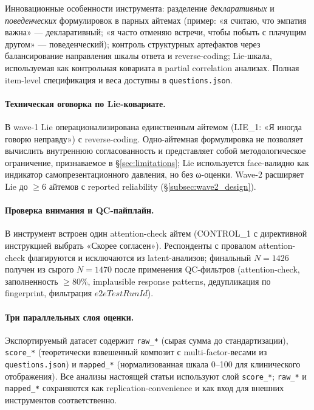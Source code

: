Инновационные особенности инструмента: разделение \emph{декларативных} и \emph{поведенческих} формулировок в парных айтемах (пример: «я считаю, что эмпатия важна» --- декларативный; «я часто отменяю встречи, чтобы побыть с плачущим другом» --- поведенческий); контроль структурных артефактов через балансирование направления шкалы ответа и reverse-coding; Lie-шкала, используемая как контрольная ковариата в partial correlation анализах. Полная item-level спецификация и веса доступны в \texttt{questions.json}.

\paragraph{Техническая оговорка по Lie-ковариате.} В wave-1 Lie операционализирована единственным айтемом (LIE\_1: «Я иногда говорю неправду») с reverse-coding. Одно-айтемная формулировка не позволяет вычислить внутреннюю согласованность и представляет собой методологическое ограничение, признаваемое в §\ref{sec:limitations}; Lie используется face-валидно как индикатор самопрезентационного давления, но без ω-оценки. Wave-2 расширяет Lie до $\geq 6$ айтемов с reported reliability (§\ref{subsec:wave2_design}).

\paragraph{Проверка внимания и QC-пайплайн.} В инструмент встроен один attention-check айтем (CONTROL\_1 с директивной инструкцией выбрать «Скорее согласен»). Респонденты с провалом attention-check флагируются и исключаются из latent-анализов; финальный $N = 1426$ получен из сырого $N = 1470$ после применения QC-фильтров (attention-check, заполненность $\geq 80\%$, implausible response patterns, дедупликация по fingerprint, фильтрация $e2eTestRunId$).

\paragraph{Три параллельных слоя оценки.} Экспортируемый датасет содержит \texttt{raw\_*} (сырая сумма до стандартизации), \texttt{score\_*} (теоретически взвешенный композит с multi-factor-весами из \texttt{questions.json}) и \texttt{mapped\_*} (нормализованная шкала 0--100 для клинического отображения). Все анализы настоящей статьи используют слой \texttt{score\_*}; \texttt{raw\_*} и \texttt{mapped\_*} сохраняются как replication-convenience и как вход для внешних инструментов соответственно.

